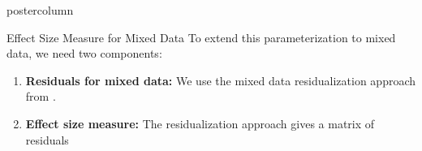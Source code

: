 \documentclass{beamer}
\newlength{\columnheight}
\begin{document}
\begin{frame}
\begin{columns}
	\begin{column}{.33\textwidth}
		\begin{beamercolorbox}[center]{postercolumn}
			\begin{minipage}{.98\textwidth} %
				\parbox[t][\columnheight]{\textwidth}{ %
	\begin{myblock}{Effect Size Measure for Mixed Data}
		To extend this parameterization to mixed data, we need two components:

		\begin{enumerate}
			\item \textbf{Residuals for mixed data:} We use the mixed data residualization approach from \citet{Ankan2023}.
			\item \textbf{Effect size measure:} The residualization approach gives a matrix of residuals 
		\end{enumerate}






\end{myblock}}
\end{minipage}
\end{beamercolorbox}
\end{column}
\end{columns}
\end{frame}
\end{document}
